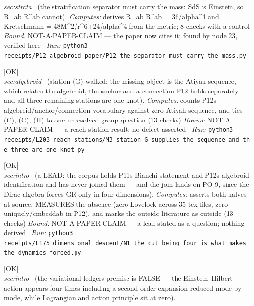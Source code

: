 \begin{description}
\textit{sec:strata} \ (the stratification separator must carry the mass: SdS is Einstein, so R\_ab R\textasciicircum{}ab cannot). 
\emph{Computes:} derives R\_ab R\textasciicircum{}ab = 36/alpha\textasciicircum{}4 and Kretschmann = 48M\textasciicircum{}2/r\textasciicircum{}6+24/alpha\textasciicircum{}4 from the metric; 8 checks with a control
 \emph{Bound:} NOT-A-PAPER-CLAIM --- the paper now cites it; found by node 23, verified here
\ \emph{Run:} \texttt{python3 receipts/P12\_algebroid\_paper/P12\_the\_separator\_must\_carry\_the\_mass.py}
\item[\label{rcpt:M3_station_G_supplies_the_sequence_and_the_three_are_one_knot}\textbf{}\quad\texttt{M3\_station\_G\_supplies\_the\_sequence\_and\_the\_three\_are\_one\_knot}]\hfill\textsf{[OK]}\\
\textit{sec:algebroid} \ (station (G) walked: the missing object is the Atiyah sequence, which relates the algebroid, the anchor and a connection P12 holds separately --- and all three remaining stations are one knot). 
\emph{Computes:} counts P12s algebroid/anchor/connection vocabulary against zero Atiyah sequence, and ties (C), (G), (H) to one unresolved group question (13 checks)
 \emph{Bound:} NOT-A-PAPER-CLAIM --- a reach-station result; no defect asserted
\ \emph{Run:} \texttt{python3 receipts/L203\_reach\_stations/M3\_station\_G\_supplies\_the\_sequence\_and\_the\_three\_are\_one\_knot.py}
\item[\label{rcpt:N1_the_cut_being_four_is_what_makes_the_dynamics_forced}\textbf{}\quad\texttt{N1\_the\_cut\_being\_four\_is\_what\_makes\_the\_dynamics\_forced}]\hfill\textsf{[OK]}\\
\textit{sec:intro} \ (a LEAD: the corpus holds P11s Bianchi statement and P12s algebroid identification and has never joined them --- and the join lands on PO-9, since the Dirac algebra forces GR only in four dimensions). 
\emph{Computes:} asserts both halves at source, MEASURES the absence (zero Lovelock across 35 tex files, zero uniquely/embeddab in P12), and marks the outside literature as outside (13 checks)
 \emph{Bound:} NOT-A-PAPER-CLAIM --- a lead stated as a question; nothing derived
\ \emph{Run:} \texttt{python3 receipts/L175\_dimensional\_descent/N1\_the\_cut\_being\_four\_is\_what\_makes\_the\_dynamics\_forced.py}
\item[\label{rcpt:V1_the_variational_ledgers_premise_is_false}\textbf{}\quad\texttt{V1\_the\_variational\_ledgers\_premise\_is\_false}]\hfill\textsf{[OK]}\\
\textit{sec:intro} \ (the variational ledgers premise is FALSE --- the Einstein--Hilbert action appears four times including a second-order expansion reduced mode by mode, while Lagrangian and action principle sit at zero). 

\end{description}
